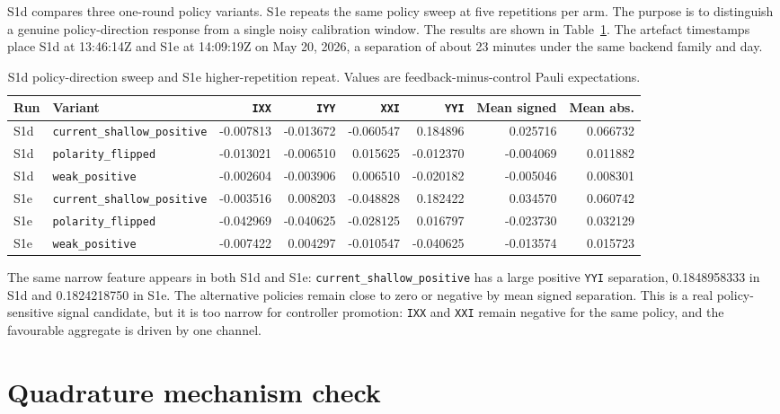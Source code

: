 \documentclass[preprint,aps,physrev,superscriptaddress,floatfix,longbibliography]{revtex4-2}
\begin{document}
S1d compares three one-round policy variants. S1e repeats the same policy
sweep at five repetitions per arm. The purpose is to distinguish a genuine
policy-direction response from a single noisy calibration window. The results
are shown in Table~\ref{tab:s1de}. The artefact timestamps place S1d at
13:46:14Z and S1e at 14:09:19Z on May 20, 2026, a separation of about
23 minutes under the same backend family and day.

\begin{table}[tb]
\centering
\scriptsize
\begin{tabular}{@{}llrrrrrr@{}}
\toprule
Run & Variant & \texttt{IXX} & \texttt{IYY} & \texttt{XXI} & \texttt{YYI} & Mean signed & Mean abs. \\
\midrule
S1d & \texttt{current\_shallow\_positive} & -0.007813 & -0.013672 & -0.060547 & 0.184896 & 0.025716 & 0.066732 \\
S1d & \texttt{polarity\_flipped} & -0.013021 & -0.006510 & 0.015625 & -0.012370 & -0.004069 & 0.011882 \\
S1d & \texttt{weak\_positive} & -0.002604 & -0.003906 & 0.006510 & -0.020182 & -0.005046 & 0.008301 \\
\midrule
S1e & \texttt{current\_shallow\_positive} & -0.003516 & 0.008203 & -0.048828 & 0.182422 & 0.034570 & 0.060742 \\
S1e & \texttt{polarity\_flipped} & -0.042969 & -0.040625 & -0.028125 & 0.016797 & -0.023730 & 0.032129 \\
S1e & \texttt{weak\_positive} & -0.007422 & 0.004297 & -0.010547 & -0.040625 & -0.013574 & 0.015723 \\
\bottomrule
\end{tabular}
\caption{S1d policy-direction sweep and S1e higher-repetition repeat. Values
are feedback-minus-control Pauli expectations.}
\label{tab:s1de}
\end{table}

The same narrow feature appears in both S1d and S1e:
\texttt{current\_shallow\_positive} has a large positive \texttt{YYI}
separation, 0.1848958333 in S1d and 0.1824218750 in S1e. The alternative
policies remain close to zero or negative by mean signed separation. This is a
real policy-sensitive signal candidate, but it is too narrow for controller
promotion: \texttt{IXX} and \texttt{XXI} remain negative for the same policy,
and the favourable aggregate is driven by one channel.

\section{Quadrature mechanism check}
\end{document}
